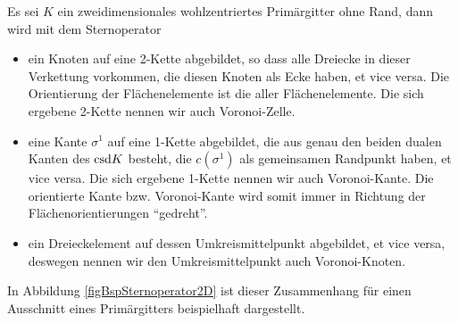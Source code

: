   \begin{bemerkung}
    Es sei \( K \) ein zweidimensionales wohlzentriertes Primärgitter ohne Rand,
    dann wird mit dem Sternoperator
    \begin{itemize}
      \item ein Knoten auf eine 2-Kette abgebildet, so dass alle Dreiecke in dieser Verkettung vorkommen, die diesen Knoten als Ecke haben, 
            et vice versa.
            Die Orientierung der Flächenelemente ist die aller Flächenelemente. 
            Die sich ergebene 2-Kette nennen wir auch Voronoi-Zelle.
      \item eine Kante \( \sigma^{1} \) auf eine 1-Kette abgebildet, die aus genau den beiden dualen Kanten des \( \text{csd} K \) besteht, die \( c(\sigma^{1}) \) als gemeinsamen Randpunkt
            haben, et vice versa.
            Die sich ergebene 1-Kette nennen wir auch Voronoi-Kante. 
            Die orientierte Kante bzw. Voronoi-Kante wird somit immer in Richtung der Flächenorientierungen "`gedreht"'.
      \item ein Dreieckelement auf dessen Umkreismittelpunkt abgebildet, et vice versa, 
            deswegen nennen wir den Umkreismittelpunkt auch Voronoi-Knoten.
    \end{itemize}
    In Abbildung \ref{figBspSternoperator2D} ist dieser Zusammenhang für einen Ausschnitt eines Primärgitters beispielhaft dargestellt.
  \end{bemerkung}


